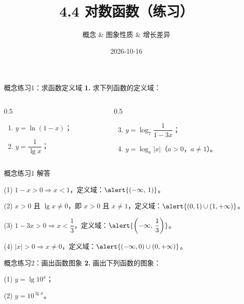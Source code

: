 \documentclass[10pt,aspectratio=169,serif]{beamer}
\title[对数函数练习]{4.4 对数函数（练习）}
\subtitle{概念 \& 图象性质 \& 增长差异}
\author{}
\institute{}
\date{2026-10-16}
\begin{document}
\begin{frame}
  \titlepage
\end{frame}

\begin{frame}[t]{概念练习1：求函数定义域}
\textbf{1.} 求下列函数的定义域：

\vspace{0.5em}
\begin{columns}[t]
\begin{column}{0.5\textwidth}
\begin{enumerate}
  \item $y = \ln(1-x)$；
  \item $y = \dfrac{1}{\lg x}$；
\end{enumerate}
\end{column}
\begin{column}{0.5\textwidth}
\begin{enumerate}\setcounter{enumi}{2}
  \item $y = \log_7\dfrac{1}{1-3x}$；
  \item $y = \log_a |x|$（$a>0$，$a\neq 1$）。
\end{enumerate}
\end{column}
\end{columns}
\end{frame}

\begin{frame}[t]{概念练习1 解答}
\begin{tcolorbox}[colback=orange!10,colframe=orange,title=\textbf{解}]
(1) $1-x > 0 \Rightarrow x < 1$，定义域：$\alert{(-\infty,\,1)}$。

(2) $x>0$ 且 $\lg x \neq 0$，即 $x>0$ 且 $x\neq 1$，定义域：$\alert{(0,1)\cup(1,+\infty)}$。

(3) $1-3x > 0 \Rightarrow x < \dfrac{1}{3}$，定义域：$\alert{\left(-\infty,\,\dfrac{1}{3}\right)}$。

(4) $|x| > 0 \Rightarrow x \neq 0$，定义域：$\alert{(-\infty,0)\cup(0,+\infty)}$。
\end{tcolorbox}
\end{frame}

\begin{frame}[t]{概念练习2：画出函数图象}
\textbf{2.} 画出下列函数的图象：

\vspace{0.8em}
(1) $y = \lg 10^x$；

\vspace{0.8em}
(2) $y = 10^{\lg x}$。
\end{frame}
\end{document}
